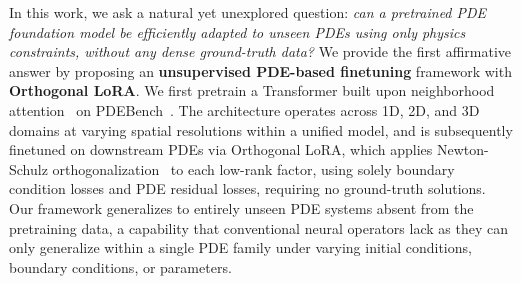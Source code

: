 \documentclass{article}
\begin{document}
In this work, we ask a natural yet unexplored question: \emph{can a pretrained PDE foundation model be efficiently adapted to unseen PDEs using only physics constraints, without any dense ground-truth data?} We provide the first affirmative answer by proposing an \textbf{unsupervised PDE-based finetuning} framework with \textbf{Orthogonal LoRA}. We first pretrain a Transformer built upon neighborhood attention~\cite{hassani2023neighborhood} on PDEBench~\cite{takamoto2022pdebench}. The architecture operates across 1D, 2D, and 3D domains at varying spatial resolutions within a unified model, and is subsequently finetuned on downstream PDEs via Orthogonal LoRA, which applies Newton-Schulz orthogonalization~\cite{jordan2024muon} to each low-rank factor, using solely boundary condition losses and PDE residual losses, requiring no ground-truth solutions. Our framework generalizes to entirely unseen PDE systems absent from the pretraining data, a capability that conventional neural operators lack as they can only generalize within a single PDE family under varying initial conditions, boundary conditions, or parameters.
\end{document}
